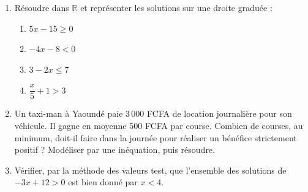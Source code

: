 \documentclass[11pt]{article}
\begin{document}
\begin{exercice}
\begin{enumerate}
    \item Résoudre dans $\mathbb{R}$ et représenter les solutions sur une droite graduée :
    \begin{enumerate}
        \item $5x - 15 \geq 0$
        \item $-4x - 8 < 0$
        \item $3 - 2x \leq 7$
        \item $\dfrac{x}{5} + 1 > 3$
    \end{enumerate}
    \item Un taxi-man à Yaoundé paie 3\,000 FCFA de location journalière pour son véhicule. Il gagne en moyenne 500 FCFA par course. Combien de courses, au minimum, doit-il faire dans la journée pour réaliser un bénéfice strictement positif ? Modéliser par une inéquation, puis résoudre.
    \item Vérifier, par la méthode des valeurs test, que l'ensemble des solutions de $-3x + 12 > 0$ est bien donné par $x < 4$.
\end{enumerate}
\end{exercice}
\end{document}
